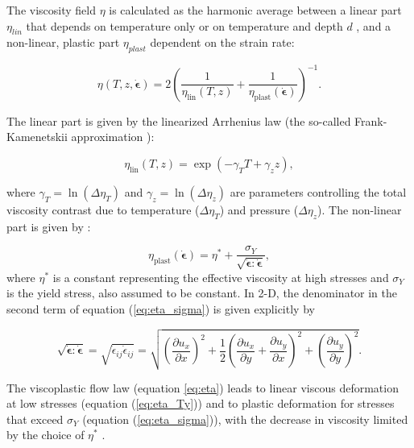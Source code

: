 The viscosity field $\eta$ is calculated as the harmonic average between a linear part $\eta_{lin}$ 
that depends on temperature only or on temperature and depth $d$ , and a non-linear,
plastic part $\eta_{plast}$ dependent on the strain rate:

\begin{equation}
\eta(T,z,\dot{\boldsymbol{\epsilon}}) = 
2 \left(\frac{1}{\eta_\text{lin}(T,z)} + \frac{1}{\eta_\text{plast}(\dot{\boldsymbol{\epsilon}})} \right)^{-1}. 
\label{eq:eta}
\end{equation}

The linear part is given by the linearized Arrhenius law (the so-called Frank-Kamenetskii approximation \cite{fran69}):

\begin{equation}
\eta_\text{lin} (T,z) = \exp(-\gamma_T T + \gamma_{z} z), \label{eq:eta_Ty}
\end{equation}

where $\gamma_T = \ln ( \Delta\eta_T)$ and $\gamma_{z}=\ln(\Delta\eta_{z})$ are parameters controlling the total viscosity 
contrast due to temperature ($\Delta\eta_T$) and pressure ($\Delta\eta_{z}$). The non-linear part is given by \cite{trha98,trha98b}: 

\begin{equation}
\eta_\text{plast} (\dot{\boldsymbol{\epsilon}}) 
= \eta^{*} + \frac{\sigma_Y}{\sqrt{\dot{\boldsymbol{\epsilon}}:\dot{\boldsymbol{\epsilon}}}}, \label{eq:eta_sigma}
\end{equation}
where $\eta^*$ is a constant representing the effective viscosity at high stresses \cite{stlh14} and $\sigma_Y$ is the yield stress, also assumed to be constant. In 2-D, the denominator in the second term of 
equation (\ref{eq:eta_sigma}) is given explicitly by

\begin{equation}
\sqrt{\dot{\boldsymbol{\epsilon}}:\dot{\boldsymbol{\epsilon}}} 
= \sqrt{\dot{\epsilon}_{ij} \dot{\epsilon}_{ij} } 
= \sqrt{\left( \frac{\partial u_x}{\partial x} \right)^2 + \frac{1}{2} \left( \frac{\partial u_x}{\partial y} 
+ \frac{\partial u_y}{\partial x} \right)^2 + \left( \frac{\partial u_y}{\partial y} \right)^2  }.
\end{equation}

The viscoplastic flow law (equation \ref{eq:eta}) leads to linear viscous 
deformation at low stresses (equation (\ref{eq:eta_Ty})) 
and to plastic deformation for stresses that exceed $\sigma_Y$ (equation (\ref{eq:eta_sigma})), 
with the decrease in viscosity limited by the choice of $\eta^{*}$ \cite{stlh14}.

